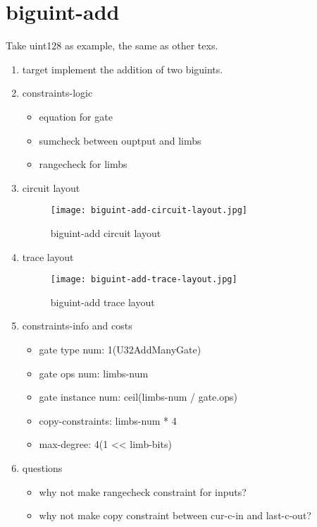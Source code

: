 \section{biguint-add}
\label{biguint-add}

Take uint128 as example, the same as other texs.

\begin{enumerate}
    \item target
        implement the addition of two biguints.
    \item constraints-logic
        \begin{itemize}
            \item equation for gate
            \item sumcheck between ouptput and limbs
            \item rangecheck for limbs
        \end{itemize}
    \item circuit layout
        \begin{figure}[!ht]
            \centering
            \texttt{[image: biguint-add-circuit-layout.jpg]}
            \caption{biguint-add circuit layout}
            \label{fig:biguint-add-circuit-layout}
        \end{figure}

    \item trace layout
        \begin{figure}[!ht]
            \centering
            \texttt{[image: biguint-add-trace-layout.jpg]}
            \caption{biguint-add trace layout}
            \label{fig:biguint-add-trace-layout}
        \end{figure}
    
    \item constraints-info and costs
        \begin{itemize}
            \item gate type num: 1(U32AddManyGate)
            \item gate ops num: limbs-num
            \item gate instance num: ceil(limbs-num / gate.ops)
            \item copy-constraints: limbs-num * 4
            \item max-degree: 4(1 << limb-bits)
        \end{itemize}

    \item questions
        \begin{itemize}
            \item why not make rangecheck constraint for inputs?
            \item why not make copy constraint between cur-c-in and last-c-out?
        \end{itemize}

\end{enumerate}